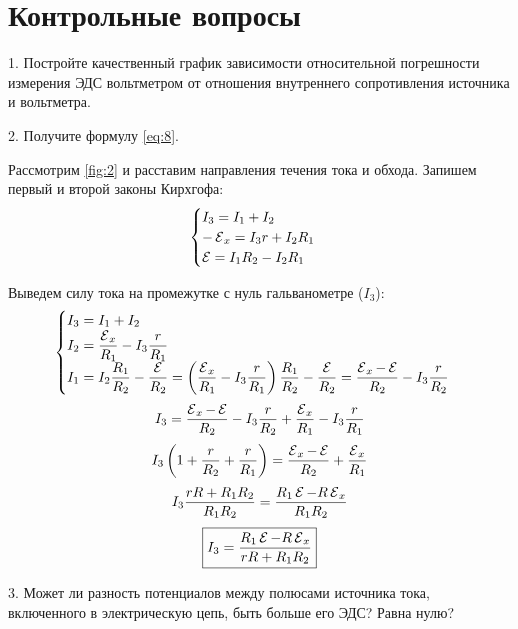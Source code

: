 \section{Контрольные вопросы}

\begin{librarybox}
	1. Постройте качественный график зависимости относительной погрешности измерения ЭДС вольтметром от отношения внутреннего сопротивления источника и вольтметра.
\end{librarybox}

\begin{librarybox}
	2. Получите формулу \cref{eq:8}.
\end{librarybox}

Рассмотрим \cref{fig:2} и расставим направления течения тока и обхода. Запишем первый и второй законы Кирхгофа:
\begin{align} \label{eq:4.1}
	\begin{cases}
		I_3 = I_1 + I_2\\
		-\operatorname{\mathcal{E}}_x = I_3 r + I_2 R_1\\
		\operatorname{\mathcal{E}} = I_1 R_2 - I_2 R_1
	\end{cases}
\end{align}

Выведем силу тока на промежутке с нуль гальванометре ($I_3$):
\begin{align}\label{eq:4.2}
	\begin{cases}
		I_3 = I_1 + I_2\\
		I_2 = \dfrac{\operatorname{\mathcal{E}}_x}{R_1} - I_3 \dfrac{r}{R_1}\\
		I_1 = I_2 \dfrac{R_1}{R_2} - \dfrac{\operatorname{\mathcal{E}}}{R_2} = \left(\dfrac{\operatorname{\mathcal{E}}_x}{R_1} - I_3 \dfrac{r}{R_1}\right) \dfrac{R_1}{R_2} - \dfrac{\operatorname{\mathcal{E}}}{R_2} = \dfrac{\operatorname{\mathcal{E}}_x - \operatorname{\mathcal{E}}}{R_2} - I_3 \dfrac{r}{R_2}
	\end{cases}
\end{align}
\[I_3 = \dfrac{\operatorname{\mathcal{E}}_x - \operatorname{\mathcal{E}}}{R_2} - I_3 \dfrac{r}{R_2} + \dfrac{\operatorname{\mathcal{E}}_x}{R_1} - I_3 \dfrac{r}{R_1}\]
\[I_3 \left(1 + \dfrac{r}{R_2} + \dfrac{r}{R_1}\right) = \dfrac{\operatorname{\mathcal{E}}_x - \operatorname{\mathcal{E}}}{R_2} + \dfrac{\operatorname{\mathcal{E}}_x}{R_1}\]
\[I_3 \dfrac{r R + R_1 R_2}{R_1 R_2} = \dfrac{R_1 \operatorname{\mathcal{E}} - R \operatorname{\mathcal{E}}_x}{R_1 R_2}\]
\begin{align} \label{eq:4.3}
	\boxed{I_3 = \dfrac{R_1 \operatorname{\mathcal{E}} - R \operatorname{\mathcal{E}}_x}{r R + R_1 R_2}}
\end{align}

\begin{librarybox}
	3. Может ли разность потенциалов между полюсами источника тока, включенного в электрическую цепь, быть больше его ЭДС? Равна нулю?
\end{librarybox}

